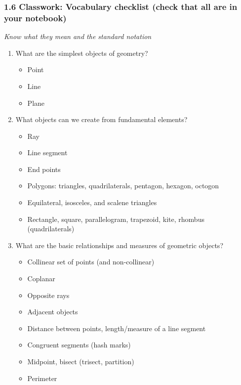 

\fancyhead[LE]{\thepage}


\renewcommand{\labelitemi}{$\square$}

\subsubsection*{1.6 Classwork: Vocabulary checklist (check that all are in your notebook)}
\emph{Know what they mean and the standard notation}
\begin{enumerate}
\item What are the simplest objects of geometry?
\begin{itemize}
    \item Point
    \item Line
    \item Plane
\end{itemize}

\item What objects can we create from fundamental elements?
\begin{itemize}
    \item Ray
    \item Line segment
    \item End points
    \item Polygons: triangles, quadrilaterals, pentagon, hexagon, octogon
    \item Equilateral, isosceles, and scalene triangles
    \item Rectangle, square, parallelogram, trapezoid, kite, rhombus (quadrilaterals)
\end{itemize}

\item What are the basic relationships and measures of geometric objects?
\begin{itemize}
    \item Collinear set of points (and non-collinear)
    \item Coplanar
    \item Opposite rays
    \item Adjacent objects
    \item Distance between points, length/measure of a line segment
    \item Congruent segments (hash marks)
    \item Midpoint, bisect (trisect, partition)
    \item Perimeter
\end{itemize}


\end{enumerate}
